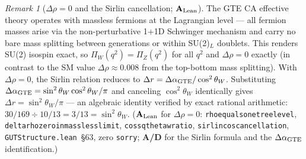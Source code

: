 \documentclass[11pt]{article}
\theoremstyle{remark}
\newtheorem{remark}[theorem]{Remark}
\newcommand{\lean}[1]{%
  \penalty-100
  \begingroup\def\_{\textunderscore\allowbreak}\texttt{#1}\endgroup}
\newcommand{\CatAL}{\ensuremath{\textbf{A}_{\rm Lean}}}
\newcommand{\CatAD}{\textbf{A/D}}
\begin{document}
\begin{remark}[$\Delta\rho = 0$ and the Sirlin cancellation; $\CatAL$]
\label{rem:delta_rho_zero}
The GTE CA effective theory operates with massless fermions at the Lagrangian level ---
all fermion masses arise via the non-perturbative 1+1D Schwinger mechanism and carry no
bare mass splitting between generations or within SU(2)$_L$ doublets.
This renders SU(2) isospin exact, so $\Pi_W(q^2) = \Pi_Z(q^2)$ for all $q^2$
and $\Delta\rho = 0$ exactly (in contrast to the SM value $\Delta\rho \approx 0.008$
from the top-bottom mass splitting).
With $\Delta\rho = 0$, the Sirlin relation reduces to
$\Delta r = \Delta\alpha_{\rm GTE}/\cos^2\theta_W$.
Substituting $\Delta\alpha_{\rm GTE} = \sin^2\theta_W\cos^2\theta_W/\pi$ and canceling
$\cos^2\theta_W$ identically gives $\Delta r = \sin^2\theta_W/\pi$ --- an algebraic
identity verified by exact rational arithmetic: $30/169 \div 10/13 = 3/13 = \sin^2\theta_W$.
(\CatAL{} for $\Delta\rho = 0$: \lean{rho\_equals\_one\_tree\_level},
\lean{delta\_rho\_zero\_in\_massless\_limit},
\lean{cos\_sq\_theta\_w\_ratio},
\lean{sirlin\_cos\_cancellation},
\texttt{GUTStructure.lean}~\S63, zero \texttt{sorry};
\CatAD{} for the Sirlin formula and the $\Delta\alpha_{\rm GTE}$ identification.)
\end{remark}
\end{document}
